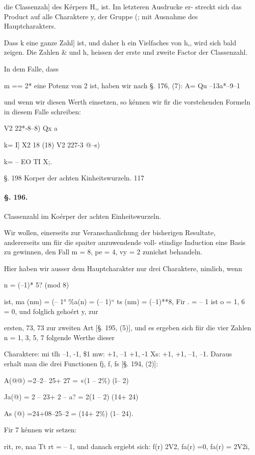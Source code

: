 \documentclass[12pt,a4paper]{article}
\theoremstyle{plain}
\theoremstyle{definition}
\begin{document}
die Classenzah] des Kérpers H,, ist. Im letzteren Ausdrucke er- streckt sich das Product auf alle Charaktere y, der Gruppe (; mit Ausnahme des Hauptcharakters.

Dass k eine ganze Zahl] ist, und daher h ein Vielfaches von h,, wird sich bald zeigen. Die Zahlen \& und h, heissen der erste und zweite Factor der Classenzahl.

In dem Falle, dass

m == 2* eine Potenz von 2 ist, haben wir nach §. 176, (7): A= Qu --13a*--9--1

und wenn wir diesen Werth einsetzen, so kénnen wir fir die vorstehenden Formeln in diesem Falle schreiben:

V2 22*-8--8) Qx a

k= I] X2 18 (18) V2 227-3 @--s)

k= -- EO TI X;.

§. 198 Korper der achten Kinheitswurzeln. 117

\paragraph{§. 196.}

Classenzahl im Koérper der achten Einheitswurzeln.

Wir wollen, einerseits zur Veranschaulichung der bisherigen Resultate, andererseits um fiir die spaiter anzuwendende voll- stindige Induction eine Basis zu gewinnen, den Fall m = 8, pe = 4, vy = 2 zunichst behandeln.

Hier haben wir ausser dem Hauptcharakter nur drei Charaktere, nimlich, wenn

n = (--1)* 5? (mod 8)

ist, ma (nm) = (-- 1° \%a(n) = (-- 1)`` ts (nm) = (--1)**8, Fir . = -- 1 ist o = 1, 6 = 0, und folglich gehoért y, zur

ersten, 73, 73 zur zweiten Art [§. 195, (5)], und es ergeben sich fiir die vier Zahlen n = 1, 3, 5, 7 folgende Werthe dieser

Charaktere: mi tlh --1, -1, \$1 mw: +1, --1 +1, -1 Xs: +1, +1, --1, --1. Daraus erhalt man die drei Functionen fj, f, fs [§. 194, (2)]:

A(@@) =2--2-- 25+ 27 = «(1 -- 2\%) (l-- 2)

Ja(@) = 2 -- 23+ 2 -- a? = 2(1 -- 2) (14+ 24)

As (@) =24+08--25--2 = (14+ 2\%) (1-- 24).

Fir 7 kénnen wir setzen:

rit, re, naa Tt rt = -- 1, und danach ergiebt sich: f(r) 2V2, fa(r) =0, fa(r) = 2V2i,
\end{document}
